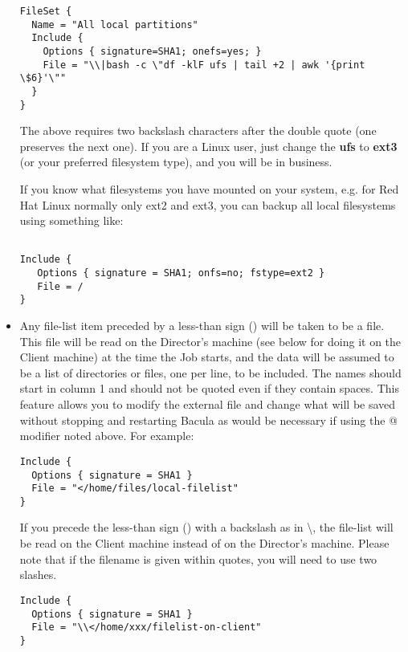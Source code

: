 \begin{itemize}
\footnotesize
\begin{verbatim}
FileSet {
  Name = "All local partitions"
  Include {
    Options { signature=SHA1; onefs=yes; }
    File = "\\|bash -c \"df -klF ufs | tail +2 | awk '{print \$6}'\""
  }
}
\end{verbatim}
\normalsize

   The above requires two backslash characters after the double quote (one
   preserves  the next one). If you are a Linux user, just change the {\bf ufs}
   to  {\bf ext3} (or your preferred filesystem type), and you will be in 
   business.  

   If you know what filesystems you have mounted on your system, e.g. 
   for Red Hat Linux normally only ext2 and ext3, you can backup
   all local filesystems using something like:

\footnotesize
\begin{verbatim}
 
Include {
   Options { signature = SHA1; onfs=no; fstype=ext2 }
   File = /
}
\end{verbatim}
\normalsize


\item Any file-list item preceded by a less-than sign (\lt{})  will be taken
   to be a file. This file will be read on the Director's machine (see
   below for doing it on the Client machine) at the time
   the Job starts, and the  data will be assumed to be a list of directories or
   files,  one per line, to be included. The names should start in  column 1 and
   should not be quoted even if they contain  spaces. This feature allows you to
   modify the external  file and change what will be saved without stopping and 
   restarting Bacula as would be necessary if using the @  modifier noted above.
   For example: 

\footnotesize
\begin{verbatim}
Include {
  Options { signature = SHA1 }
  File = "</home/files/local-filelist"
}
\end{verbatim}
\normalsize

   If you precede the less-than sign (\lt{}) with a backslash as in
   \textbackslash{}\lt{}, the file-list will be read on the Client machine
   instead of on the Director's machine.  Please note that if the filename
   is given within quotes, you will need to use two slashes.

\footnotesize
\begin{verbatim}
Include {
  Options { signature = SHA1 }
  File = "\\</home/xxx/filelist-on-client"
}
\end{verbatim}
\normalsize


\end{itemize}
